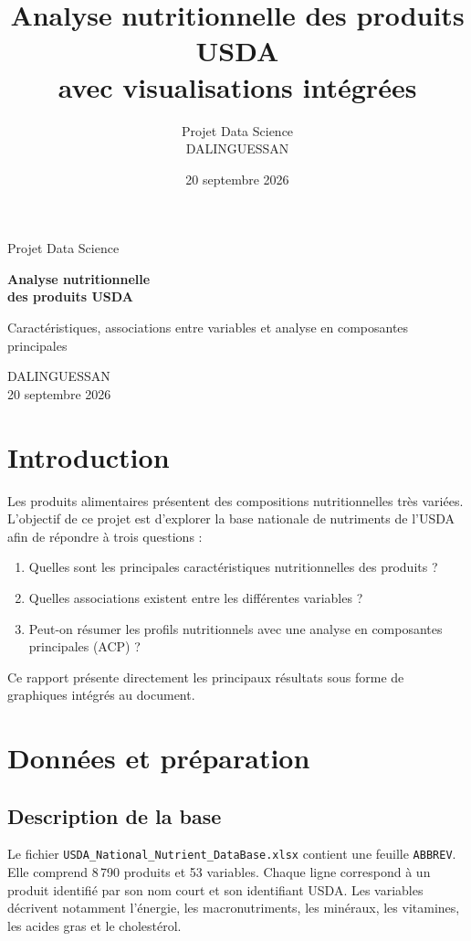 \documentclass[12pt,a4paper]{article}
\title{\textbf{Analyse nutritionnelle des produits USDA\\avec visualisations intégrées}}
\author{Projet Data Science\\DALINGUESSAN}
\date{20 septembre 2026}
\begin{document}
\begin{titlepage}
    \centering
    \vspace*{2cm}
    {\Large Projet Data Science\par}
    \vspace{1.5cm}
    {\Huge\bfseries Analyse nutritionnelle\\des produits USDA\par}
    \vspace{1.5cm}
    {\large Caractéristiques, associations entre variables et analyse en composantes principales\par}
    \vfill
    {\large DALINGUESSAN\\20 septembre 2026\par}
\end{titlepage}

\tableofcontents
\newpage

\section{Introduction}

Les produits alimentaires présentent des compositions nutritionnelles très variées. L'objectif de ce projet est d'explorer la base nationale de nutriments de l'USDA afin de répondre à trois questions :
\begin{enumerate}[label=\arabic*.]
    \item Quelles sont les principales caractéristiques nutritionnelles des produits ?
    \item Quelles associations existent entre les différentes variables ?
    \item Peut-on résumer les profils nutritionnels avec une analyse en composantes principales (ACP) ?
\end{enumerate}

Ce rapport présente directement les principaux résultats sous forme de graphiques intégrés au document. 

\section{Données et préparation}

\subsection{Description de la base}

Le fichier \texttt{USDA\_National\_Nutrient\_DataBase.xlsx} contient une feuille \texttt{ABBREV}. Elle comprend 8\,790 produits et 53 variables. Chaque ligne correspond à un produit identifié par son nom court et son identifiant USDA. Les variables décrivent notamment l'énergie, les macronutriments, les minéraux, les vitamines, les acides gras et le cholestérol.
\end{document}
